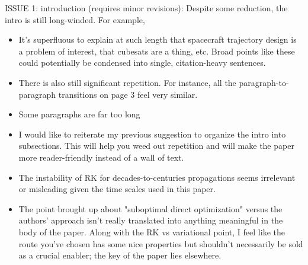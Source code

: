 \documentclass[11pt]{article}
\begin{document}
\begin{itshape}
ISSUE 1: introduction (requires minor revisions): 
Despite some reduction, the intro is still long-winded.  For example,
\end{itshape}

\begin{itemize}
    \item
        \begin{itshape}
            It's superfluous to explain at such length that spacecraft trajectory design is a problem of interest, that cubesats are a thing, etc. Broad points like these could potentially be condensed into single, citation-heavy sentences. 
        \end{itshape}
    \item 
        \begin{itshape}
            There is also still significant repetition. For instance, all the paragraph-to-paragraph transitions on page 3 feel very similar.
        \end{itshape}
    \item 
        \begin{itshape}
            Some paragraphs are far too long
        \end{itshape}
    \item 
        \begin{itshape}
            I would like to reiterate my previous suggestion to organize the intro into subsections.  This will help you weed out repetition and will make the paper more reader-friendly instead of a wall of text.
        \end{itshape}
    \item 
        \begin{itshape}
            The instability of RK for decades-to-centuries propagations seems irrelevant or misleading given the time scales used in this paper.
        \end{itshape}
    \item 
        \begin{itshape}
            The point brought up about "suboptimal direct optimization" versus the authors' approach isn't really translated into anything meaningful in the body of the paper. Along with the RK vs variational point, I feel like the route you've chosen has some nice properties but shouldn't necessarily be sold as a crucial enabler; the key of the paper lies elsewhere.
        \end{itshape}
\end{itemize}
\end{document}
